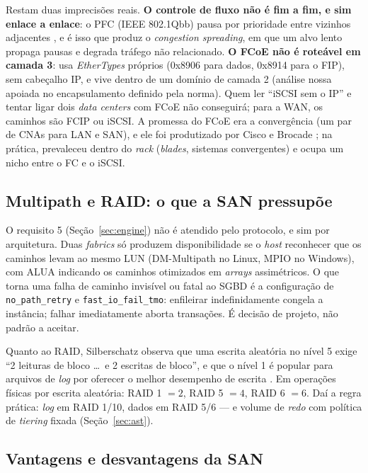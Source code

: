 \documentclass[11pt,a4paper]{article}
\begin{document}
Restam duas imprecisões reais. \textbf{O controle de fluxo não é fim a fim, e sim enlace a enlace}: o PFC
(IEEE 802.1Qbb) pausa por prioridade entre vizinhos adjacentes \cite{ieee8021qbb}, e é isso que produz o
\textit{congestion spreading}, em que um alvo lento propaga pausas e degrada tráfego não relacionado.
\textbf{O FCoE não é roteável em camada 3}: usa \textit{EtherTypes} próprios (0x8906 para dados, 0x8914
para o FIP), sem cabeçalho IP, e vive dentro de um domínio de camada 2 (análise nossa apoiada no
encapsulamento definido pela norma). Quem ler ``iSCSI sem o IP'' e tentar ligar dois \textit{data
centers} com FCoE não conseguirá; para a WAN, os caminhos são FCIP ou iSCSI. A promessa do FCoE era a
convergência (um par de CNAs para LAN e SAN), e ele foi produtizado por Cisco e Brocade
\cite{elmasri2018}; na prática, prevaleceu dentro do \textit{rack} (\textit{blades}, sistemas
convergentes) e ocupa um nicho entre o FC e o iSCSI.

\subsection{Multipath e RAID: o que a SAN pressupõe}
\label{sec:multipath}

O requisito 5 (Seção~\ref{sec:engine}) não é atendido pelo protocolo, e sim por arquitetura. Duas
\textit{fabrics} só produzem disponibilidade se o \textit{host} reconhecer que os caminhos levam ao
mesmo LUN (DM-Multipath no Linux, MPIO no Windows), com ALUA indicando os caminhos otimizados em
\textit{arrays} assimétricos. O que torna uma falha de caminho invisível ou fatal ao SGBD é a
configuração de \texttt{no\_path\_retry} e \texttt{fast\_io\_fail\_tmo}: enfileirar indefinidamente
congela a instância; falhar imediatamente aborta transações. É decisão de projeto, não padrão a aceitar.

Quanto ao RAID, Silberschatz observa que uma escrita aleatória no nível 5 exige ``2 leituras de bloco
\ldots\ e 2 escritas de bloco'', e que o nível 1 é popular para arquivos de \textit{log} por oferecer o
melhor desempenho de escrita \cite{silberschatz2020}. Em operações físicas por escrita aleatória: RAID 1
$= 2$, RAID 5 $= 4$, RAID 6 $= 6$. Daí a regra prática: \textit{log} em RAID 1/10, dados em RAID 5/6 --- e
volume de \textit{redo} com política de \textit{tiering} fixada (Seção~\ref{sec:ast}).

\subsection{Vantagens e desvantagens da SAN}
\label{sec:vantsan}
\end{document}
